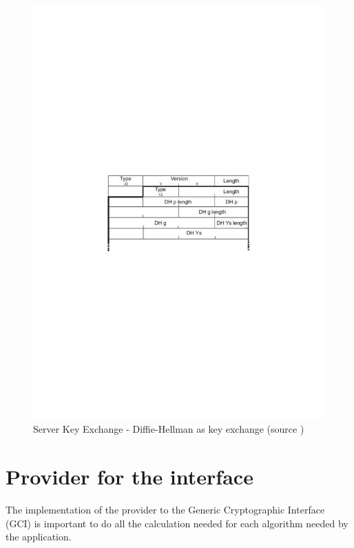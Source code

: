 \begin{figure}[!ht]
\centering
\includegraphics[trim=2cm 12cm 0cm 12cm]{figures/srv_key_exg.pdf}
\caption{Server Key Exchange - Diffie-Hellman as key exchange (source
\cite{book2})}
\label{fig:srv_key_exg}
\end{figure}

\section{Provider for the interface}

The implementation of the \tomcrypt provider to the Generic Cryptographic
Interface (GCI) is important to do all the calculation needed for each algorithm
needed by the application.

